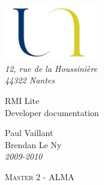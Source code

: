 \begin{titlepage}

\vspace*{2cm}



\begin{flushleft}
	\hspace{1cm} \includegraphics*[width=4cm]{../img/logo.jpg}\\
	\hspace{1cm} \textsl{12, rue de la Houssinière}\\
	\hspace{1cm} \textit{44322 Nantes}
	\hrulefill
\end{flushleft}




\vspace{2cm}

\begin{flushright}

	{\fontsize{1.4cm}{1.65cm}\selectfont 
RMI Lite} 	 \\

	{\fontsize{0.7cm}{0.825cm}\selectfont 
Developer documentation} 	 \\

	\vspace{1cm}

	Paul Vaillant \\
	Brendan Le Ny \\

	\textit{2009-2010}
	
\end{flushright}


\vspace{2cm}

\begin{flushleft}



	\hspace{1cm} \textsc{Master 2 - ALMA}\\
	
\end{flushleft}

\hspace*{0,5cm}\hrulefill
\end{titlepage}
